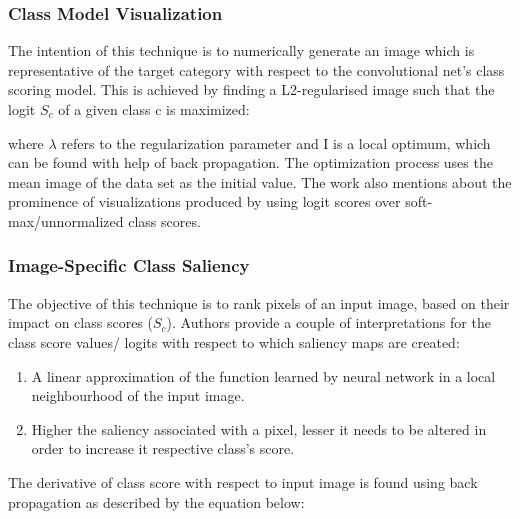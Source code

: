\documentclass[../report.tex]{subfiles}
\begin{document}
 \subsubsection{Class Model Visualization}
 The intention of this technique is to numerically generate an image which is representative of the target category with respect to the convolutional net’s class scoring model. This is achieved by finding a L2-regularised image such that the logit $S_{c}$  of a given class c is maximized:
 
 	
 
 where  $\lambda$ refers to the regularization parameter and I is a local optimum, which can be found with help of back propagation. The optimization process uses the mean image of the data set as the initial value. The work also mentions about the prominence of visualizations produced by using logit scores over soft-max/unnormalized class scores.   
    
 \subsubsection{Image-Specific Class Saliency}
  The objective of this technique is to rank pixels of an input image, based on their impact on class scores ($S_c$). Authors provide a couple of interpretations for the class score values/ logits with respect to which saliency maps are created:
  \begin{enumerate}
  	\item A linear approximation of the function learned by  neural network in a local neighbourhood of the input image.
  	\item Higher the saliency associated with a pixel, lesser it needs to be altered in order to increase it respective class’s score.  
  \end{enumerate}

 The derivative of class score with respect to input image is found using back propagation as described by the equation below:
 
 
 
\end{document}
